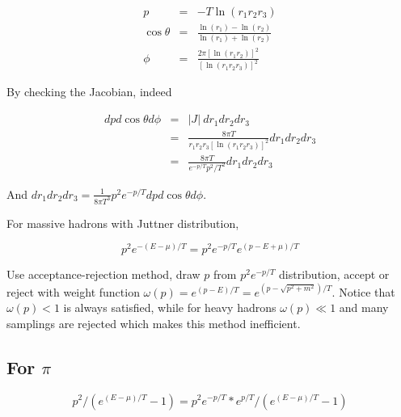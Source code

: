 \documentclass[11pt, oneside]{article}   	%
\begin{document}
\begin{eqnarray*}
p & = & -T\ln(r_{1}r_{2}r_{3})\\
\cos\theta & = & \frac{\ln(r_{1})-\ln(r_{2})}{\ln(r_{1})+\ln(r_{2})}\\
\phi & = & \frac{2\pi\left[\ln(r_{1}r_{2})\right]^{2}}{\left[\ln(r_{1}r_{2}r_{3})\right]^{2}}
\end{eqnarray*}


By checking the Jacobian, indeed

\begin{eqnarray*}
dpd\cos\theta d\phi & = & |J|\ dr_{1}dr_{2}dr_{3}\\
 & = & \frac{8\pi T}{r_{1}r_{2}r_{3}\left[\ln(r_{1}r_{2}r_{3})\right]^{2}}dr_{1}dr_{2}dr_{3}\\
 & = & \frac{8\pi T}{e^{-p/T}p^{2}/T^{2}}dr_{1}dr_{2}dr_{3}
\end{eqnarray*}


And $dr_{1}dr_{2}dr_{3}=\frac{1}{8\pi T^{3}}p^{2}e^{-p/T}dpd\cos\theta d\phi$.

For massive hadrons with Juttner distribution,

\[
p^{2}e^{-(E-\mu)/T}=p^{2}e^{-p/T}e^{(p-E+\mu)/T}
\]


Use acceptance-rejection method, draw $p$ from $p^{2}e^{-p/T}$ distribution,
accept or reject with weight function $\omega(p)=e^{(p-E)/T}=e^{(p-\sqrt{p^{2}+m^{2}})/T}$.
Notice that $\omega(p)<1$ is always satisfied, while for heavy hadrons
$\omega(p)\ll1$ and many samplings are rejected which makes this
method inefficient.


\subsection*{For $\pi$}

\[
p^{2}/(e^{(E-\mu)/T}-1)=p^{2}e^{-p/T}*e^{p/T}/(e^{(E-\mu)/T}-1)
\]
\end{document}
